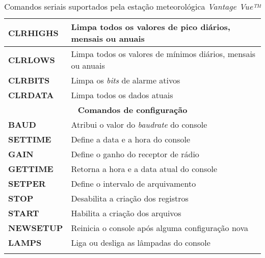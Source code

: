 \begin{anexosenv}
\begin{center}
\begin{longtable}{ll}
\textbf{CLRHIGHS}                   & Limpa todos os valores de pico diários, mensais ou anuais                                   \\ \hline
\textbf{CLRLOWS}                   & Limpa todos os valores de mínimos diários, mensais ou anuais \\ \hline
\textbf{CLRBITS}                   & Limpa os \textit{bits} de alarme ativos                                  \\ \hline
\textbf{CLRDATA}                   & Limpa todos os dados atuais                                   \\ \hline
\multicolumn{2}{c}{\cellcolor{gray!25}\textbf{Comandos de configuração}}                                     		 \\ \hline
\textbf{BAUD}                 & Atribui o valor do \textit{baudrate} do console                                                       \\ \hline
\textbf{SETTIME}                   & Define a data e a hora do console                                   \\ \hline
\textbf{GAIN}                   & Define o ganho do receptor de rádio                                   \\ \hline
\textbf{GETTIME}                   & Retorna a hora e a data atual do console                                   \\ \hline
\textbf{SETPER}                   & Define o intervalo de arquivamento                                   \\ \hline
\textbf{STOP}                   & Desabilita a criação dos registros                                   \\ \hline
\textbf{START}                   & Habilita a criação dos arquivos \\ \hline
\textbf{NEWSETUP}                   & Reinicia o console após alguma configuração nova                                  \\ \hline
\textbf{LAMPS}                   & Liga ou desliga as lâmpadas do console \\ \hline
\caption{Comandos seriais suportados pela estação meteorológica \textit{Vantage Vue™}}
\end{longtable}
\end{center}


\end{anexosenv}
